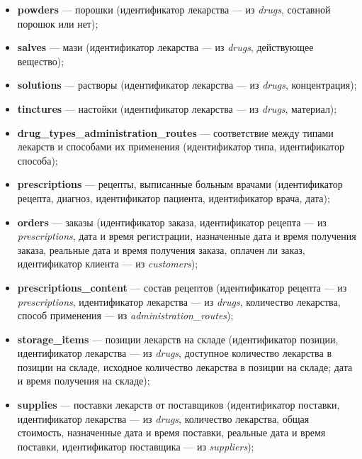\documentclass[a4paper]{article}
\newcommand{\dbtable}[1]{\textbf{#1}}
\newcommand{\dbtableref}[1]{\textit{#1}}
\begin{document}
\begin{itemize}
				\item \dbtable{powders} --- порошки (идентификатор лекарства --- из \dbtableref{drugs}, составной порошок или нет);
					
				\item \dbtable{salves} --- мази (идентификатор лекарства --- из \dbtableref{drugs}, действующее вещество);
				
				\item \dbtable{solutions} --- растворы (идентификатор лекарства --- из \dbtableref{drugs}, концентрация);
				
				\item \dbtable{tinctures} --- настойки (идентификатор лекарства --- из \dbtableref{drugs}, материал);
				
				\item \dbtable{drug\_types\_administration\_routes} --- соответствие между типами лекарств и способами их применения (идентификатор типа, идентификатор способа);
						
				\item \dbtable{prescriptions} --- рецепты, выписанные больным врачами (идентификатор рецепта, диагноз, идентификатор пациента, идентификатор врача, дата);
				
				\item \dbtable{orders} --- заказы (идентификатор заказа, идентификатор рецепта --- из \dbtableref{prescriptions}, дата и время регистрации, назначенные дата и время получения заказа, реальные дата и время получения заказа, оплачен ли заказ, идентификатор клиента --- из \dbtableref{customers});
				
				\item \dbtable{prescriptions\_content} --- состав рецептов (идентификатор рецепта --- из \dbtableref{prescriptions}, идентификатор лекарства --- из \dbtableref{drugs}, количество лекарства, способ применения --- из \dbtableref{administration\_routes});
				
				\item \dbtable{storage\_items} --- позиции лекарств на складе (идентификатор позиции, идентификатор лекарства --- из \dbtableref{drugs}, доступное количество лекарства в позиции на складе, исходное количество лекарства в позиции на складе; дата и время получения на складе);
				
				\item \dbtable{supplies} --- поставки лекарств от поставщиков (идентификатор поставки, идентификатор лекарства --- из \dbtableref{drugs}, количество лекарства, общая стоимость, назначенные дата и время поставки, реальные дата и время поставки, идентификатор поставщика --- из \dbtableref{suppliers});
					

\end{itemize}
\end{document}
